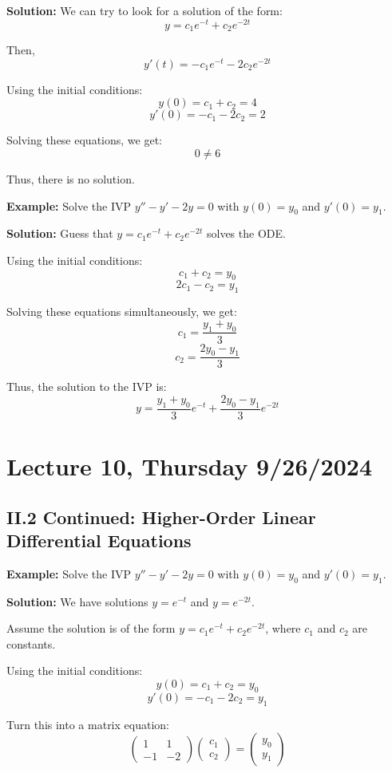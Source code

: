 \documentclass{article}
\begin{document}
\textbf{Solution:} We can try to look for a solution of the form:
\[
y = c_1 e^{-t} + c_2 e^{-2t}
\]

Then,
\[
y'(t) = -c_1 e^{-t} - 2c_2 e^{-2t}
\]

Using the initial conditions:
\[
y(0) = c_1 + c_2 = 4
\]
\[
y'(0) = -c_1 - 2c_2 = 2
\]

Solving these equations, we get:
\[
0 \neq 6
\]

Thus, there is no solution.

\textbf{Example:} Solve the IVP \( y'' - y' - 2y = 0 \) with \( y(0) = y_0 \) and \( y'(0) = y_1 \).

\textbf{Solution:} Guess that \( y = c_1 e^{-t} + c_2 e^{-2t} \) solves the ODE.

Using the initial conditions:
\[
 c_1 + c_2 = y_0
\]
\[
2c_1 - c_2 = y_1
\]

Solving these equations simultaneously, we get:
\[
c_1 = \frac{y_1 + y_0}{3}
\]
\[
c_2 = \frac{2y_0 - y_1}{3}
\]

Thus, the solution to the IVP is:
\[
y = \frac{y_1 + y_0}{3} e^{-t} + \frac{2y_0 - y_1}{3} e^{-2t}
\]

\pagebreak


\section*{Lecture 10, Thursday 9/26/2024}

\subsection*{II.2 Continued: Higher-Order Linear Differential Equations}

\textbf{Example:} Solve the IVP \( y'' - y' - 2y = 0 \) with \( y(0) = y_0 \) and \( y'(0) = y_1 \).

\textbf{Solution:} We have solutions \( y = e^{-t} \) and \( y = e^{-2t} \).

Assume the solution is of the form \( y = c_1 e^{-t} + c_2 e^{-2t} \), where \( c_1 \) and \( c_2 \) are constants.

Using the initial conditions:
\[
y(0) = c_1 + c_2 = y_0
\]
\[
y'(0) = -c_1 - 2c_2 = y_1
\]

Turn this into a matrix equation:
\[
\begin{pmatrix}
1 & 1 \\
-1 & -2
\end{pmatrix}
\begin{pmatrix}
c_1 \\
c_2
\end{pmatrix}
=
\begin{pmatrix}
y_0 \\
y_1
\end{pmatrix}
\]
\end{document}
